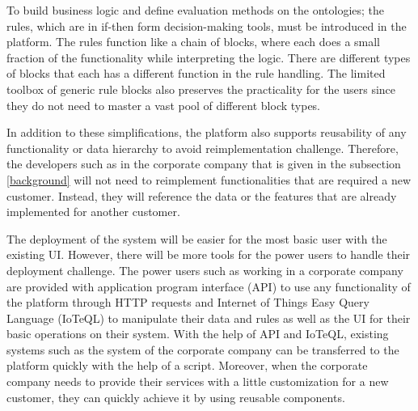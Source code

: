 To build business logic and define evaluation methods on the ontologies; the rules, which are in if-then form decision-making tools, must be introduced in the platform. The rules function like a chain of blocks, where each does a small fraction of the functionality while interpreting the logic.  There are different types of blocks that each has a different function in the rule handling. The limited toolbox of generic rule blocks also preserves the practicality for the users since they do not need to master a vast pool of different block types.

In addition to these simplifications, the platform also supports reusability of any functionality or data hierarchy to avoid reimplementation challenge. Therefore, the developers such as in the corporate company that is given in the subsection \ref{background} will not need to reimplement functionalities that are required a new customer. Instead, they will reference the data or the features that are already implemented for another customer.


The deployment of the system will be easier for the most basic user with the existing UI. However, there will be more tools for the power users to handle their deployment challenge. The power users such as working in a corporate company are provided with application program interface (API) to use any functionality of the platform through HTTP requests and Internet of Things Easy Query Language (IoTeQL) to manipulate their data and rules as well as the UI for their basic operations on their system. With the help of API and IoTeQL, existing systems such as the system of the corporate company can be transferred to the platform quickly with the help of a script. Moreover, when the corporate company needs to provide their services with a little customization for a new customer, they can quickly achieve it by using reusable components.

